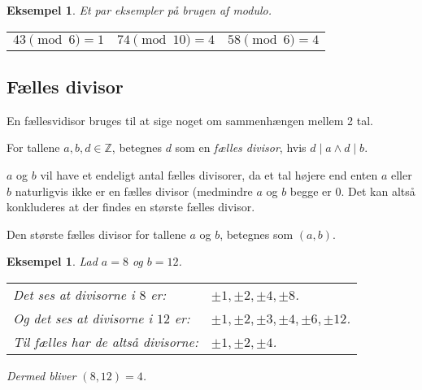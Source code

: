 \documentclass[a4paper, 12pt]{article}
\theoremstyle{break}
\newtheorem{eks}[definition]{Eksempel}
\theoremstyle{breakline}
\begin{document}
    \begin{eks}
        Et par eksempler på brugen af modulo.
        \begin{center}
            \setlength{\tabcolsep}{20pt} %
            \begin{tabular}{l c r}
                \(43 \pmod{6} = 1\) & \(74 \pmod{10} = 4\) & \(58 \pmod{6} = 4\)
            \end{tabular}
        \end{center}
    \end{eks}




    \subsection{Fælles divisor}
    En fællesvidisor bruges til at sige noget om sammenhængen mellem 2 tal.

    \begin{definition}
        For tallene \(a, b, d \in \mathbb{Z}\), betegnes \(d\) som en \emph{fælles divisor}, hvis \(d \mid a \land d \mid b\).
    \end{definition}

    \(a\) og \(b\) vil have et endeligt antal fælles divisorer, da et tal højere end enten \(a\) eller \(b\) naturligvis ikke er en fælles divisor (medmindre \(a\) og \(b\) begge er \(0\).
    Det kan altså konkluderes at der findes en største fælles divisor.

    \begin{definition}
        Den største fælles divisor for tallene \(a\) og \(b\), betegnes som \((a,b)\).
    \end{definition}

    \begin{eks}
        Lad \(a = 8\) og \(b = 12\).\\
        \begin{tabular*}{\textwidth}{@{} l l}
            Det ses at divisorne i \(8\) er: & \(\pm 1, \pm 2, \pm 4, \pm 8\).\\
            Og det ses at divisorne i \(12\) er:  &\(\pm 1, \pm 2, \pm 3, \pm 4, \pm 6, \pm 12\).\\
            Til fælles har de altså divisorne: & \(\pm 1, \pm 2, \pm 4\).
        \end{tabular*}

        Dermed bliver \((8, 12) = 4\).
    \end{eks}
\end{document}
